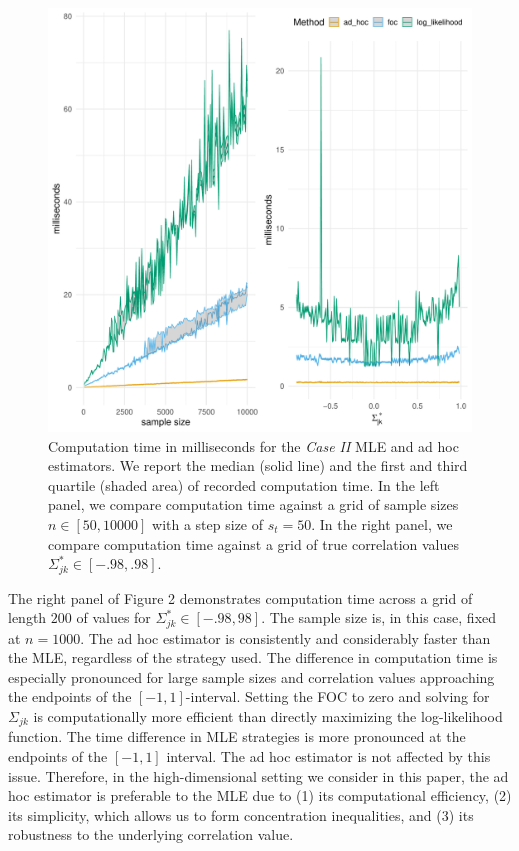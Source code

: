 \begin{change}
    \begin{figure}\label{fig:case2_speed}
        \includegraphics[width=\textwidth]{Figures/case_2_speed_comp.pdf}
        \caption{Computation time in milliseconds for the \textit{Case II} MLE and ad hoc estimators. We report the median (solid line) and the first and third quartile (shaded area) of recorded computation time. In the left panel, we compare computation time against a grid of sample sizes \(n \in [50, 10000]\) with a step size of \(s_t = 50\). In the right panel, we compare computation time against a grid of true correlation values \(\Sigma^*_{jk} \in [-.98, .98]\).}
    \end{figure}

    The right panel of Figure 2 demonstrates computation time across a grid of length \(200\) of values for \(\Sigma_{jk}^* \in [-.98, 98]\). The sample size is, in this case, fixed at \(n=1000\). The ad hoc estimator is consistently and considerably faster than the MLE, regardless of the strategy used. The difference in computation time is especially pronounced for large sample sizes and correlation values approaching the endpoints of the $[-1,1]$-interval. Setting the FOC to zero and solving for \(\Sigma_{jk}\) is computationally more efficient than directly maximizing the log-likelihood function. The time difference in MLE strategies is more pronounced at the endpoints of the $[-1,1]$ interval. The ad hoc estimator is not affected by this issue. Therefore, in the high-dimensional setting we consider in this paper, the ad hoc estimator is preferable to the MLE due to (1) its computational efficiency, (2) its simplicity, which allows us to form concentration inequalities, and (3) its robustness to the underlying correlation value.
\end{change}

